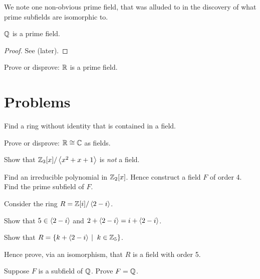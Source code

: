 We note one non-obvious prime field, that was alluded to in the discovery of what prime subfields are isomorphic to.

\begin{theorem}
    $\mathbb{Q}$ is a prime field.
\end{theorem}
\begin{proof}
    See  (later).
\end{proof}

\begin{exercise}
    Prove or disprove: $\mathbb{R}$ is a prime field.
\end{exercise}

\newpage

\section{Problems}
\begin{problem}
    Find a ring without identity that is contained in a field.
\end{problem}

\begin{problem}
    Prove or disprove: $\mathbb{R} \cong \mathbb{C}$ as fields.
\end{problem}

\begin{problem}
    Show that $\mathbb{Z}_3[x]/\left\langle x^2+x+1\right\rangle$ is \textit{not} a field.
\end{problem}

\begin{problem}
    Find an irreducible polynomial in $\mathbb{Z}_2[x]$. Hence construct a field $F$ of order 4. Find the prime subfield of $F$.
\end{problem}

\begin{problem}
    Consider the ring $R = \mathbb{Z}[i] / \left\langle2-i\right\rangle$.
    \begin{partquestions}{\roman*}
        \item Show that $5 \in \left\langle2-i\right\rangle$ and $2 + \left\langle2-i\right\rangle = i + \left\langle2-i\right\rangle$.
        \item Show that $R = \{k + \princ{2-i} \vert k \in \Z_5\}$.
        \item Hence prove, via an isomorphism, that $R$ is a field with order 5.
    \end{partquestions}
\end{problem}

\begin{problem}\label{problem-Q-is-prime-field}
    Suppose $F$ is a subfield of $\mathbb{Q}$. Prove $F = \mathbb{Q}$.
\end{problem}


